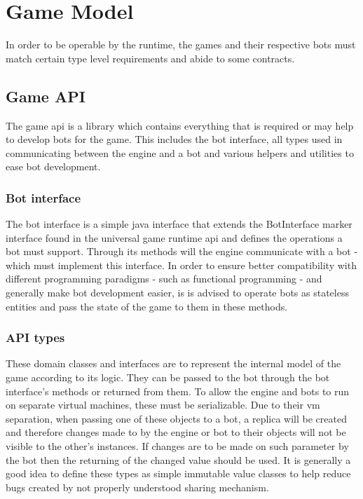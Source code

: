 
%

\chapter{Game Model}\label{sect:GameModel}

In order to be operable by the runtime, the games and their respective bots must match certain type level requirements and abide to some contracts.

	\section{Game API}
	
	The game api is a library which contains everything that is required or may help to develop bots for the game. This includes the bot interface, all types used in communicating between the engine and a bot and various helpers and utilities to ease bot development.

		\subsection{Bot interface}
		
		The bot interface is a simple java interface that extends the BotInterface marker interface found in the universal game runtime api and defines the operations a bot must support. Through its methods will the engine communicate with a bot - which must implement this interface. In order to ensure better compatibility with different programming paradigms - such as functional programming - and generally make bot development easier, is is advised to operate bots as stateless entities and pass the state of the game to them in these methods. 
		
		\subsection{API types}

		These domain classes and interfaces are to represent the internal model of the game according to its logic. They can be passed to the bot through the bot interface's methods or returned from them. To allow the engine and bots to run on separate virtual machines, these must be serializable. Due to their vm separation, when passing one of these objects to a bot, a replica will be created and therefore changes made to by the engine or bot to their objects will not be visible to the other's instances. If changes are to be made on such parameter by the bot then the returning of the changed value should be used. It is generally a good idea to define these types as simple immutable value classes to help reduce bugs created by not properly understood sharing mechanism.
		
